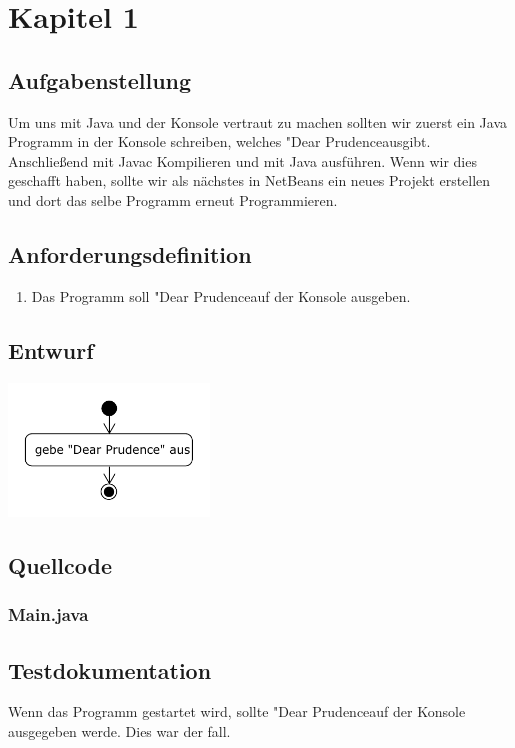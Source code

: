 \section{Kapitel 1}
\subsection{Aufgabenstellung}
Um uns mit Java und der Konsole vertraut zu machen sollten wir zuerst ein Java Programm in der Konsole
schreiben, welches "Dear Prudence\dq \space ausgibt. Anschlie\ss end mit Javac Kompilieren und mit Java
ausführen. Wenn wir dies geschafft haben, sollte wir als nächstes in NetBeans ein neues Projekt erstellen
und dort das selbe Programm erneut Programmieren. 

\subsection{Anforderungsdefinition}
\begin{enumerate}
	\item Das Programm soll "Dear Prudence\dq \space auf der Konsole ausgeben.
\end{enumerate}

\subsection{Entwurf}
\begin{center}
	\includegraphics[width=0.4\textwidth]{uml/uml_c1_p2.pdf}
\end{center}

\subsection{Quellcode}
\subsubsection{Main.java}


\subsection{Testdokumentation}
Wenn das Programm gestartet wird, sollte "Dear Prudence\dq \space auf der Konsole ausgegeben werde.
Dies war der fall.

